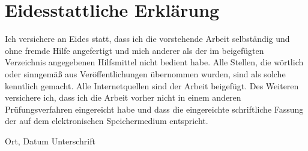 \documentclass[
  11pt,            %
  a4paper,         %
  twoside,         %
]{report}
\begin{document}
\newpage

\section*{Eidesstattliche Erklärung}
Ich versichere an Eides statt, dass ich die vorstehende Arbeit selbständig und ohne fremde Hilfe angefertigt und mich anderer als der im beigefügten Verzeichnis angegebenen Hilfsmittel nicht bedient habe. Alle Stellen, die wörtlich oder sinngemäß aus Veröffentlichungen übernommen wurden, sind als solche kenntlich gemacht. Alle Internetquellen sind der Arbeit beigefügt. Des Weiteren versichere ich, dass ich die Arbeit vorher nicht in einem anderen Prüfungsverfahren eingereicht habe und dass die eingereichte schriftliche Fassung der auf dem elektronischen Speichermedium entspricht.\\

\vspace{3cm}
\begin{flushleft}
Ort, Datum \hspace{10.84cm} Unterschrift
\end{flushleft}
\thispagestyle{empty}



\newpage
\hypersetup{pageanchor=true}
\renewcommand{\thepage}{\Roman{page}}
\tableofcontents



\newpage
{}
\renewcommand{\thepage}{\arabic{page}}
\newpage

\newpage

\newpage

\newpage

\newpage

\newpage

\end{document}
